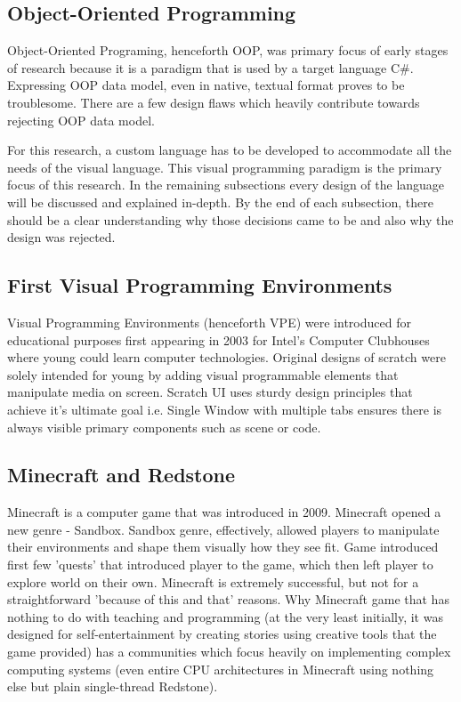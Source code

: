 \documentclass{article}
\begin{document}
\subsection{Object-Oriented Programming}
Object-Oriented Programing, henceforth OOP, was primary focus of early stages of research because it is a paradigm that is used by a target language C\#. Expressing OOP data model, even in native, textual format proves to be troublesome. There are a few design flaws which heavily contribute towards rejecting OOP data model. 

For this research, a custom language has to be developed to accommodate all the needs of the visual language. This visual programming paradigm is the primary focus of this research. In the remaining subsections every design of the language will be discussed and explained in-depth. By the end of each subsection, there should be a clear understanding why those decisions came to be and also why the design was rejected.

\subsection{First Visual Programming Environments}
Visual Programming Environments (henceforth VPE) were introduced for educational purposes first appearing in 2003 for Intel's Computer Clubhouses where young could learn computer technologies. Original designs of scratch were solely intended for young by adding visual programmable elements that manipulate media on screen.\cite{demrkiran_2021_an}
Scratch UI uses sturdy design principles that achieve it's ultimate goal i.e. Single Window with multiple tabs ensures there is always visible primary components such as scene or code.

\subsection{Minecraft and Redstone}
Minecraft is a computer game that was introduced in 2009. Minecraft opened a new genre - Sandbox. Sandbox genre, effectively, allowed players to manipulate their environments and shape them visually how they see fit. Game introduced first few 'quests' that introduced player to the game, which then left player to explore world on their own. Minecraft is extremely successful, but not for a straightforward 'because of this and that' reasons. \cite{baek_2020_mining}
Why Minecraft game that has nothing to do with teaching and programming\cite{baek_2020_mining} (at the very least initially, it was designed for self-entertainment by creating stories using creative tools that the game provided\cite{booch_2013_from}) has a communities which focus heavily on implementing complex computing systems (even entire CPU architectures in Minecraft using nothing else but plain single-thread Redstone).\cite{matteson_2017_a}
\end{document}
